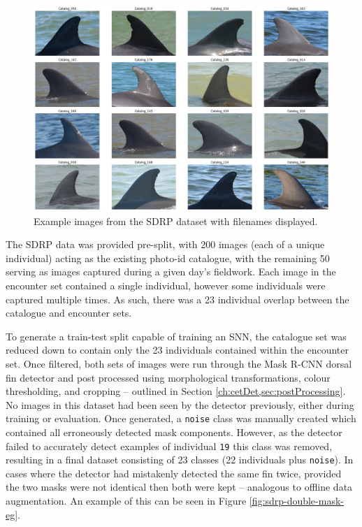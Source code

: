 \begin{figure}
	\begin{center}
		\includegraphics[scale=0.3]{Chapter6/figs/SDRP_egs_tiled.png}
	\end{center}
	\caption{Example images from the SDRP dataset with filenames displayed.}
	\label{fig:sdrp-example}
\end{figure}

The SDRP data was provided pre-split, with 200 images (each of a unique individual) acting as the existing photo-id catalogue, with the remaining 50 serving as images captured during a given day's fieldwork. Each image in the encounter set contained a single individual, however some individuals were captured multiple times. As such, there was a 23 individual overlap between the catalogue and encounter sets. 

To generate a train-test split capable of training an SNN, the catalogue set was reduced down to contain only the 23 individuals contained within the encounter set. Once filtered, both sets of images were run through the Mask R-CNN dorsal fin detector and post processed using morphological transformations, colour thresholding, and cropping -- outlined in Section \ref{ch:cetDet,sec:postProcessing}. No images in this dataset had been seen by the detector previously, either during training or evaluation. Once generated, a \texttt{noise} class was manually created which contained all erroneously detected mask components. However, as the detector failed to accurately detect examples of individual \texttt{19} this class was removed, resulting in a final dataset consisting of 23 classes (22 individuals plus \texttt{noise}). In cases where the detector had mistakenly detected the same fin twice, provided the two masks were not identical then both were kept -- analogous to offline data augmentation. An example of this can be seen in Figure \ref{fig:sdrp-double-mask-eg}.


